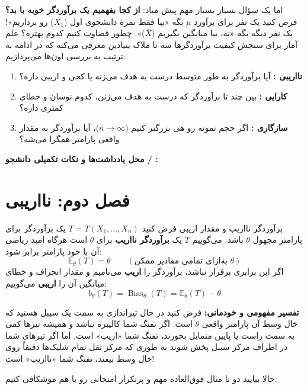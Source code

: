 \documentclass[12pt,a4paper,oneside]{report}
\newcommand{\notespace}{%
  \par\vspace{8pt}%
  \begin{tcolorbox}[breakable=false,colback=white,colframe=muted!50,boxrule=.6pt,arc=1.5mm,height=0.36\textheight]
    \textcolor{muted!70}{\small\textbf{محل یادداشت‌ها و نکات تکمیلی دانشجو / \lr{TA}:}}
  \end{tcolorbox}%
  \par\vspace{8pt}%
}
\newcommand{\E}{\mathbb E}
\newcommand{\Bias}{\operatorname{Bias}}
\begin{document}
اما یک سؤال بسیار بسیار مهم پیش میاد: \textbf{از کجا بفهمیم یک برآوردگر خوبه یا بد؟} 
فرض کنید یک نفر برای برآورد $\mu$ بگه «بیا فقط نمرهٔ دانشجوی اول ($X_1$) رو برداریم»! یک نفر دیگه بگه «نه، بیا میانگین بگیریم ($\bar{X}$)». چطور قضاوت کنیم کدوم بهتره؟ علم آمار برای سنجش کیفیت برآوردگرها سه تا ملاک بنیادین معرفی می‌کنه که در ادامه به ترتیب به بررسی اون‌ها می‌پردازیم:
\begin{enumerate}
\item \textbf{نااریبی :} آیا برآوردگر به طور متوسط درست به هدف می‌زنه یا کجی و اریبی داره؟
\item \textbf{کارایی :} بین چند تا برآوردگر که درست به هدف می‌زنن، کدوم نوسان و خطای کمتری داره؟
\item \textbf{سازگاری :} اگر حجم نمونه رو هی بزرگتر کنیم ($n \to \infty$)، آیا برآوردگر به مقدار واقعی پارامتر همگرا می‌شه؟
\end{enumerate}

\notespace

\clearpage
\chapter*{فصل دوم: نااریبی }

\begin{definition}{برآوردگر نااریب و مقدار اریبی}
فرض کنید $T = T(X_1, \dots, X_n)$ یک برآوردگر برای پارامتر مجهول $\theta$ باشد. می‌گوییم $T$ یک \textbf{برآوردگر نااریب} برای $\theta$ است هرگاه امید ریاضی آن با خود پارامتر برابر شود:
\[
\E_\theta(T) = \theta \qquad (\text{به‌ازای تمامی مقادیر ممکن } \theta)
\]
اگر این برابری برقرار نباشد، برآوردگر را \textbf{اریب } می‌نامیم و مقدار انحراف و خطای میانگین آن را \textbf{اریبی } می‌گوییم:
\[
b_\theta(T) = \Bias_\theta(T) = \E_\theta(T) - \theta
\]
\end{definition}

\textbf{تفسیر مفهومی و خودمانی:} فرض کنید در حال تیراندازی به سمت یک سیبل هستید که خال وسط آن پارامتر واقعی $\theta$ است. اگر تفنگ شما کالیبره نباشد و همیشه تیرها کمی به سمت راست یا پایین متمایل بخورند، تفنگ شما «اریب» است. اما اگر تیرهای شما در اطراف مرکز سیبل پخش شوند به طوری که مرکز ثقل تمام شلیک‌ها دقیقاً روی خال وسط بیفتد، تفنگ شما «نااریب» است!

حالا بیایید دو تا مثال فوق‌العاده مهم و پرتکرار امتحانی رو با هم موشکافی کنیم:
\end{document}
